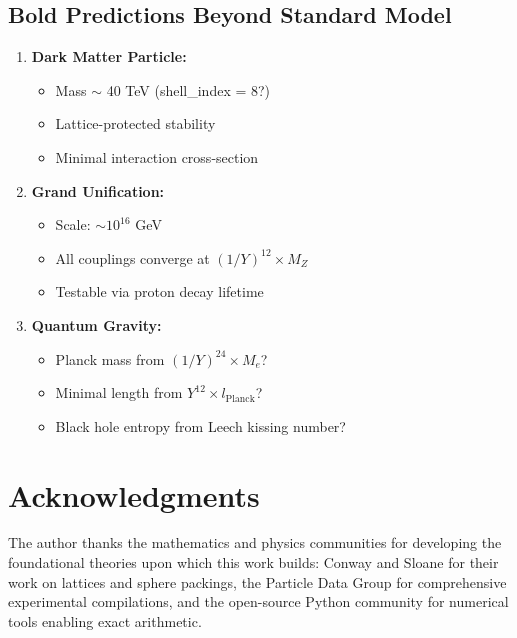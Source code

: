 \documentclass[11pt,twocolumn]{article}
\begin{document}
\subsection{Bold Predictions Beyond Standard Model}

\begin{enumerate}
\item \textbf{Dark Matter Particle:}
   \begin{itemize}
   \item Mass $\sim$ 40 TeV (shell_index = 8?)
   \item Lattice-protected stability
   \item Minimal interaction cross-section
   \end{itemize}

\item \textbf{Grand Unification:}
   \begin{itemize}
   \item Scale: $\sim 10^{16}$ GeV
   \item All couplings converge at $(1/Y)^{12} \times M_Z$
   \item Testable via proton decay lifetime
   \end{itemize}

\item \textbf{Quantum Gravity:}
   \begin{itemize}
   \item Planck mass from $(1/Y)^{24} \times M_e$?
   \item Minimal length from $Y^{12} \times l_\text{Planck}$?
   \item Black hole entropy from Leech kissing number?
   \end{itemize}
\end{enumerate}

\section*{Acknowledgments}

The author thanks the mathematics and physics communities for developing the foundational theories upon which this work builds: Conway and Sloane for their work on lattices and sphere packings, the Particle Data Group for comprehensive experimental compilations, and the open-source Python community for numerical tools enabling exact arithmetic.




\appendix
\end{document}
